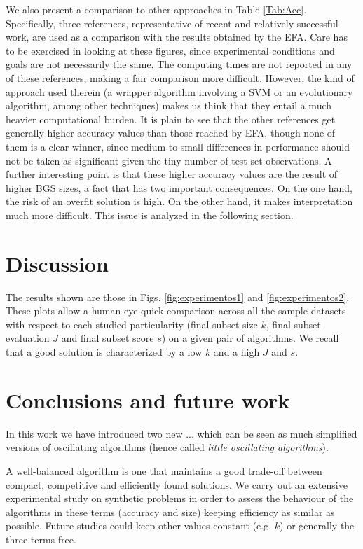 \documentclass{article}
\begin{document}
We also present a comparison to other approaches in Table
\ref{Tab:Acc}. Specifically, three references, representative of
recent and relatively successful work, are used as a comparison with
the results obtained by the EFA. Care has to be exercised in looking
at these figures, since experimental conditions and goals are not
necessarily the same. The computing times are not reported in any of
these references, making a fair comparison more difficult. However,
the kind of approach used therein (a wrapper algorithm involving a SVM
or an evolutionary algorithm, among other techniques) makes us think
that they entail a much heavier computational burden. It is plain to
see that the other references get generally higher accuracy values
than those reached by EFA, though none of them is a clear winner,
since medium-to-small differences in performance should not be taken
as significant given the tiny number of test set observations. A
further interesting point is that these higher accuracy values are the
result of higher BGS sizes, a fact that has two important
consequences. On the one hand, the risk of an overfit solution is
high. On the other hand, it makes interpretation much more difficult.
This issue is analyzed in the following section.

\section{Discussion}
\label{section:results}

The results shown are those in Figs. \ref{fig:experimentos1} and
\ref{fig:experimentos2}.  These plots allow a human-eye quick
comparison across all the sample datasets with respect to each studied
particularity (final subset size $k$, final subset evaluation $J$ and
final subset score $s$) on a given pair of algorithms. We recall that
a good solution is characterized by a low $k$ and a high $J$ and $s$.


\section{Conclusions and future work}
In this work we have introduced two new ...
which can be seen as much simplified versions of oscillating
algorithms (hence called {\em little oscillating algorithms}).

A well-balanced algorithm is one that maintains a good trade-off
between compact, competitive and efficiently found solutions. We carry
out an extensive experimental study on synthetic problems in order to
assess the behaviour of the algorithms in these terms (accuracy and size)
keeping efficiency as similar as possible. Future studies could keep
other values constant (e.g. $k$) or generally the three terms free.
\end{document}
